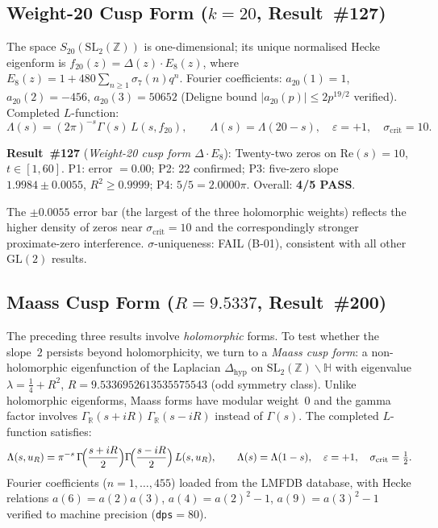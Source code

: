 \documentclass[11pt, a4paper]{article}
\theoremstyle{plain}
\theoremstyle{definition}
\begin{document}
\subsection{Weight-20 Cusp Form ($k=20$, Result~\#127)}
\label{ssec:w20}

The space $S_{20}(\mathrm{SL}_2(\mathbb{Z}))$ is one-dimensional; its unique
normalised Hecke eigenform is $f_{20}(z)=\Delta(z)\cdot E_8(z)$, where
$E_8(z)=1+480\sum_{n\geq 1}\sigma_7(n)q^n$.  Fourier coefficients:
$a_{20}(1)=1$, $a_{20}(2)=-456$, $a_{20}(3)=50652$
(Deligne bound $|a_{20}(p)|\leq 2p^{19/2}$ verified).
Completed $L$-function:
\[
  \Lambda(s)=(2\pi)^{-s}\Gamma(s)\,L(s,f_{20}), \qquad
  \Lambda(s)=\Lambda(20-s), \quad \varepsilon=+1, \quad
  \sigma_{\mathrm{crit}}=10.
\]

\noindent\textbf{Result~\#127} (\textit{Weight-20 cusp form $\Delta\cdot E_8$}):
Twenty-two zeros on $\mathrm{Re}(s)=10$, $t\in[1,60]$.
P1: error $=0.00$; P2: 22 confirmed;
P3: five-zero slope $\mathbf{1.9984\pm 0.0055}$, $R^{2}\geq 0.9999$;
P4: $5/5=2.0000\pi$.  Overall: \textbf{4/5 PASS}.

The $\pm 0.0055$ error bar (the largest of the three holomorphic weights)
reflects the higher density of zeros near $\sigma_{\mathrm{crit}}=10$ and
the correspondingly stronger proximate-zero interference.
$\sigma$-uniqueness: FAIL (B-01), consistent with all other $\mathrm{GL}(2)$
results.

\subsection{Maass Cusp Form ($R=9.5337$, Result~\#200)}
\label{ssec:maass}

The preceding three results involve \emph{holomorphic} forms.  To test
whether the slope~$2$ persists beyond holomorphicity, we turn to a
\emph{Maass cusp form}: a non-holomorphic eigenfunction of the Laplacian
$\Delta_{\mathrm{hyp}}$ on $\mathrm{SL}_2(\mathbb{Z})\backslash\mathbb{H}$
with eigenvalue $\lambda = \tfrac{1}{4}+R^2$, $R=9.5336952613535575543$
(odd symmetry class).  Unlike holomorphic eigenforms, Maass forms have
modular weight~$0$ and the gamma factor involves
$\Gamma_{\mathbb{R}}(s+iR)\,\Gamma_{\mathbb{R}}(s-iR)$ instead of
$\Gamma(s)$.  The completed $L$-function satisfies:
\[
  \Lambda(s,u_R) = \pi^{-s}\,
  \Gamma\!\Bigl(\frac{s+iR}{2}\Bigr)
  \Gamma\!\Bigl(\frac{s-iR}{2}\Bigr)\,L(s,u_R), \qquad
  \Lambda(s)=\Lambda(1-s), \quad \varepsilon=+1, \quad
  \sigma_{\mathrm{crit}}=\tfrac{1}{2}.
\]
Fourier coefficients ($n=1,\ldots,455$) loaded from the LMFDB database,
with Hecke relations $a(6)=a(2)a(3)$, $a(4)=a(2)^2-1$, $a(9)=a(3)^2-1$
verified to machine precision (\texttt{dps}$=80$).
\end{document}
